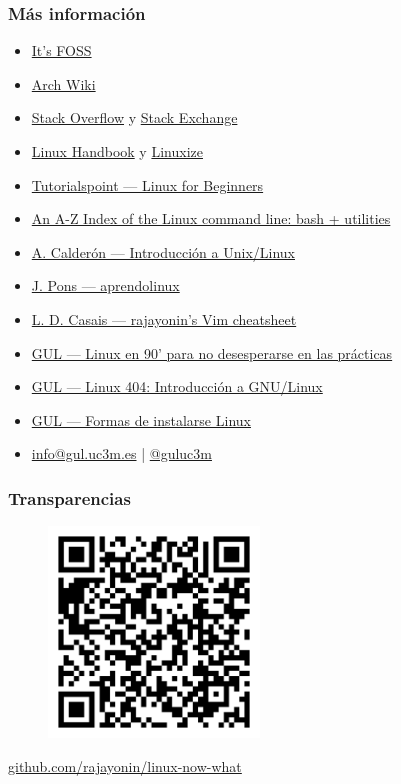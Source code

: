 \documentclass[aspectratio=43]{beamer}
\begin{document}
\begin{frame}
    \frametitle{Más información}

    \begin{itemize}
        \item \href{https://itsfoss.com/}{It's FOSS}
        \item \href{https://wiki.archlinux.org/}{Arch Wiki}
        \item \href{https://stackoverflow.com/}{Stack Overflow} y \href{https://stackoverflow.com/}{Stack Exchange}
        \item \href{https://stackoverflow.com/}{Linux Handbook} y \href{https://linuxize.com/}{Linuxize}
        \item \href{https://www.tutorialspoint.com/unix/index.htm}{Tutorialspoint — Linux for Beginners}
        \item \href{https://ss64.com/bash/}{An A-Z Index of the Linux command line: bash + utilities}
        \item \href{https://github.com/acaldero/uc3m_linux}{A. Calderón — Introducción a Unix/Linux}
        \item \href{https://aprendolinux.com}{J. Pons — aprendolinux}
        \item \href{https://github.com/rajayonin/cheatsheets/blob/main/vim_cheatsheet.md}{L. D. Casais — rajayonin's Vim cheatsheet}
        \item \href{https://youtu.be/2qZBUa93MQ8}{GUL — Linux en 90' para no desesperarse en las prácticas}
        \item \href{https://cloud-gul.uc3m.es/s/4qXKozr7DmDSZiN}{GUL — Linux 404: Introducción a GNU/Linux}
        \item \href{https://github.com/guluc3m/linux404/blob/main/README.md}{GUL — Formas de instalarse Linux}
        \item \href{mailto:info@gul.uc3m.es}{info@gul.uc3m.es} | \href{https://twitter.com/guluc3m}{@guluc3m}
    \end{itemize}

\end{frame}


\begin{frame}
    \frametitle{Transparencias}
    \centering
    
    \begin{figure}
        \includegraphics[width=0.5\textwidth]{img/qr-code.png}
    \end{figure}

    \href{https://github.com/rajayonin/linux-now-what}{github.com/rajayonin/linux-now-what}

\end{frame}
\end{document}
